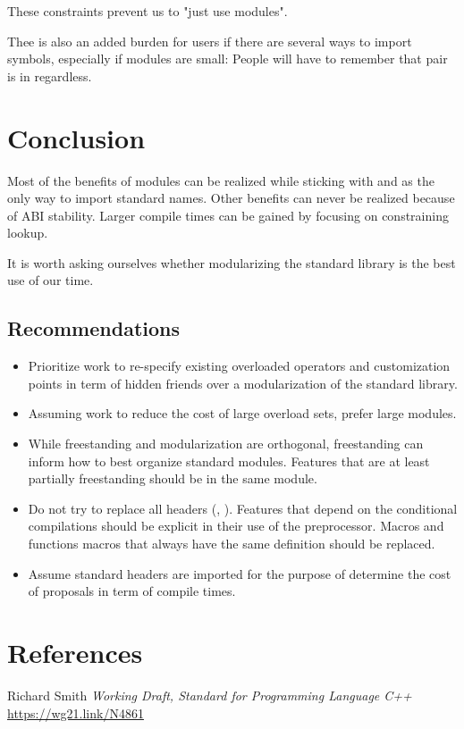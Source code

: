 \documentclass{wg21}
\begin{document}
These constraints prevent us to "just use modules".

Thee is also an added burden for users if there are several ways to import symbols, especially if modules are
small: People will have to remember that pair is in  regardless.


\section{Conclusion}

Most of the benefits of modules can be realized while sticking with  and 
as the only way to import standard names.
Other benefits can never be realized because of ABI stability.
Larger compile times can be gained by focusing on constraining lookup.

It is worth asking ourselves whether modularizing the standard library is the best use of our time.

\subsection{Recommendations}

\begin{itemize}
\item Prioritize work to re-specify existing overloaded operators and customization points in term of hidden friends over a modularization of the standard library.
\item Assuming work to reduce the cost of large overload sets, prefer large modules.
\item While freestanding and modularization are orthogonal, freestanding can inform how to best organize standard modules. Features that are at least partially freestanding  should be in the same module.
\item Do not try to replace all headers (, ). Features that depend on the conditional compilations should be explicit in their use of the preprocessor. Macros and functions macros that always have the same definition should be replaced.
\item Assume standard headers are imported for the purpose of determine the cost of proposals in term of compile times.
\end{itemize}



\section{References}
\renewcommand{\section}[2]{}%



\begin{thebibliography}{9}

    Richard Smith
    \emph{Working Draft, Standard for Programming Language C++}\newline
    \url{https://wg21.link/N4861}

\end{thebibliography}
\end{document}

